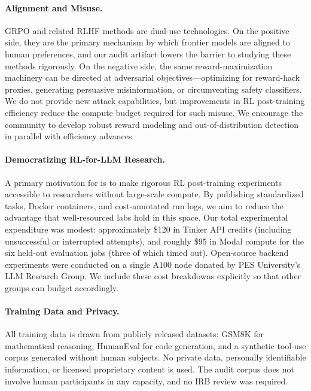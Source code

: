 \paragraph{Alignment and Misuse.}
GRPO and related RLHF methods are dual-use technologies. On the positive side,
they are the primary mechanism by which frontier models are aligned to human
preferences, and our audit artifact lowers the barrier to studying these methods
rigorously. On the negative side, the same reward-maximization machinery can
be directed at adversarial objectives---optimizing for reward-hack proxies,
generating persuasive misinformation, or circumventing safety classifiers. We
do not provide new attack capabilities, but improvements in RL post-training
efficiency reduce the compute budget required for such misuse. We encourage
the community to develop robust reward modeling and out-of-distribution
detection in parallel with efficiency advances.

\paragraph{Democratizing RL-for-LLM Research.}
A primary motivation for \ours{} is to make rigorous RL post-training
experiments accessible to researchers without large-scale compute. By
publishing standardized tasks, Docker containers, and cost-annotated run
logs, we aim to reduce the advantage that well-resourced labs hold in this
space. Our total experimental expenditure was modest: approximately \$120 in
Tinker API credits (including unsuccessful or interrupted attempts),
and roughly \$95 in Modal compute for the six held-out evaluation jobs
(three of which timed out). Open-source backend experiments were conducted on
a single A100 node donated by PES University's LLM Research Group. We include
these cost breakdowns explicitly so that other groups can budget accordingly.

\paragraph{Training Data and Privacy.}
All training data is drawn from publicly released datasets: GSM8K
\citep{cobbe2021training} for mathematical reasoning, HumanEval
\citep{chen2021codex} for code generation, and a synthetic tool-use corpus
generated without human subjects. No private data, personally identifiable
information, or licensed proprietary content is used. The audit corpus does not
involve human participants in any capacity, and no IRB review was required.


